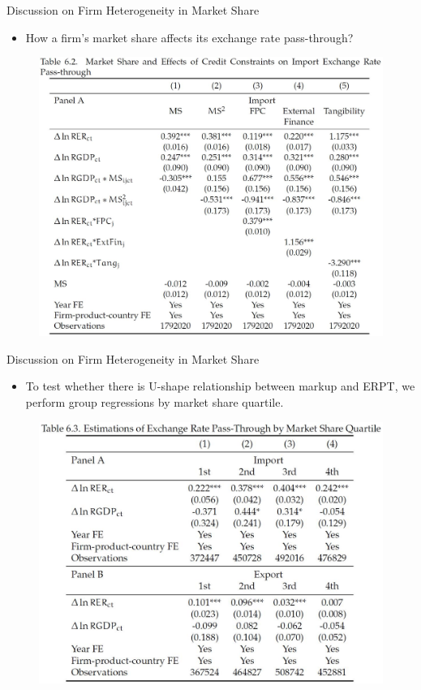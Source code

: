 \documentclass[10pt]{beamer}
\begin{document}
\begin{frame}{Discussion on Firm Heterogeneity in Market Share}
	\begin{itemize}
		\item How a firm's market share affects its exchange rate pass-through?
	\end{itemize}
	\begin{figure}[htbp]
		\centering
		\includegraphics[width=0.8\columnwidth]{Table6.2.jpg}
		\label{tab6.2}
	\end{figure}
\end{frame}

\begin{frame}{Discussion on Firm Heterogeneity in Market Share}
	\begin{itemize}
		\item To test whether there is U-shape relationship between markup and ERPT, we perform group regressions by market share quartile.
	\end{itemize}
	\begin{figure}[htbp]
		\centering
		\includegraphics[width=0.8\columnwidth]{Table6.3.jpg}
		\label{tab6.3}
	\end{figure}
\end{frame}
\end{document}
